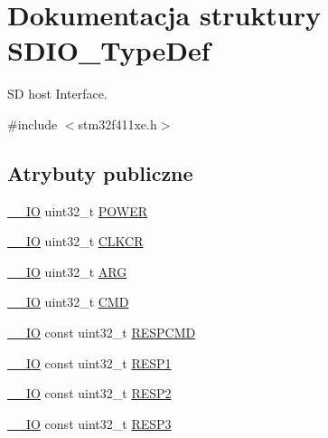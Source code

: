 \hypertarget{struct_s_d_i_o___type_def}{}\section{Dokumentacja struktury S\+D\+I\+O\+\_\+\+Type\+Def}
\label{struct_s_d_i_o___type_def}


SD host Interface.  




{\ttfamily \#include $<$stm32f411xe.\+h$>$}

\subsection*{Atrybuty publiczne}
\begin{DoxyCompactItemize}
\item 
\hyperlink{core__sc300_8h_aec43007d9998a0a0e01faede4133d6be}{\+\_\+\+\_\+\+IO} uint32\+\_\+t \hyperlink{struct_s_d_i_o___type_def_a7c156bc55f6d970a846a459d57a9e940}{P\+O\+W\+ER}
\item 
\hyperlink{core__sc300_8h_aec43007d9998a0a0e01faede4133d6be}{\+\_\+\+\_\+\+IO} uint32\+\_\+t \hyperlink{struct_s_d_i_o___type_def_aeb1e30ce2038628e45264f75e5e926bb}{C\+L\+K\+CR}
\item 
\hyperlink{core__sc300_8h_aec43007d9998a0a0e01faede4133d6be}{\+\_\+\+\_\+\+IO} uint32\+\_\+t \hyperlink{struct_s_d_i_o___type_def_a3e24392875e98cd09043e54a0990ab7a}{A\+RG}
\item 
\hyperlink{core__sc300_8h_aec43007d9998a0a0e01faede4133d6be}{\+\_\+\+\_\+\+IO} uint32\+\_\+t \hyperlink{struct_s_d_i_o___type_def_abbbdc3174e12dab21123d746d65f345d}{C\+MD}
\item 
\hyperlink{core__sc300_8h_aec43007d9998a0a0e01faede4133d6be}{\+\_\+\+\_\+\+IO} const uint32\+\_\+t \hyperlink{struct_s_d_i_o___type_def_ad0076eec3f30c0279c193da7173af543}{R\+E\+S\+P\+C\+MD}
\item 
\hyperlink{core__sc300_8h_aec43007d9998a0a0e01faede4133d6be}{\+\_\+\+\_\+\+IO} const uint32\+\_\+t \hyperlink{struct_s_d_i_o___type_def_a53f4c92d9a06bfee520718c82f0027b1}{R\+E\+S\+P1}
\item 
\hyperlink{core__sc300_8h_aec43007d9998a0a0e01faede4133d6be}{\+\_\+\+\_\+\+IO} const uint32\+\_\+t \hyperlink{struct_s_d_i_o___type_def_af06e60089c11f9402d69a56aa828edda}{R\+E\+S\+P2}
\item 
\hyperlink{core__sc300_8h_aec43007d9998a0a0e01faede4133d6be}{\+\_\+\+\_\+\+IO} const uint32\+\_\+t \hyperlink{struct_s_d_i_o___type_def_a51c8a77f72757a2c17d38b61ff13f356}{R\+E\+S\+P3}

\end{DoxyCompactItemize}
